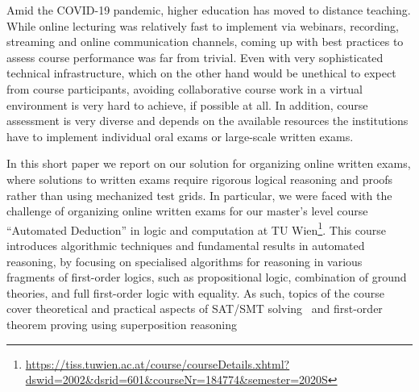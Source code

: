 Amid the COVID-19 pandemic, higher education has moved to distance
teaching. While online lecturing was relatively fast to implement via
webinars, recording,  streaming and online communication channels,
coming up with best practices to assess course performance was far
from trivial. Even with very sophisticated technical infrastructure,
which on the other hand would be unethical to expect from course
participants,  avoiding collaborative course work in a virtual
environment is very hard to achieve, if possible at all.
In addition, course assessment is very diverse and depends on the
available resources the  institutions have to implement individual oral
exams or large-scale written exams.

In this short paper we report on our solution for organizing online
written exams, where solutions to written exams require rigorous
logical reasoning and proofs rather than using mechanized test grids.
In particular, we were faced with the challenge of organizing online
written exams for our master's level course ``Automated
Deduction'' in logic and computation at TU
Wien\footnote{\url{https://tiss.tuwien.ac.at/course/courseDetails.xhtml?dswid=2002\&dsrid=601\&courseNr=184774\&semester=2020S}}.
This course introduces algorithmic techniques and fundamental results
in automated reasoning, by focusing on specialised algorithms for
reasoning in various fragments of first-order logics, such as
propositional logic, combination of ground theories, and full
first-order logic with equality.
As such, topics of the course cover theoretical and practical
aspects of SAT/SMT solving~\cite{DPLL,Tinelli02,DPLLT} and first-order theorem proving using
superposition reasoning~\cite{Ganzinger01,Rubio01,Vampire13}

